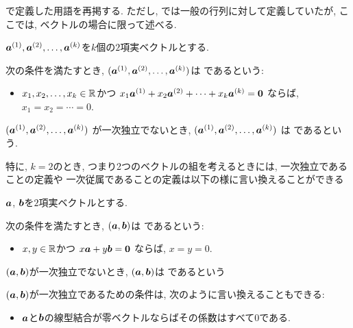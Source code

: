 で定義した用語を再掲する.
ただし, では一般の行列に対して定義していたが,
ここでは, ベクトルの場合に限って述べる.
\begin{definition}
  \label{def:linindep}
  $\boldsymbol{a}^{(1)}, \boldsymbol{a}^{(2)},\ldots, \boldsymbol{a}^{(k)}$を$k$個の$2$項実ベクトルとする.
  
  次の条件を満たすとき,
  $(\boldsymbol{a}^{(1)}, \boldsymbol{a}^{(2)},\ldots, \boldsymbol{a}^{(k)})$は
  であるという:
  \begin{itemize}
  \item
    $x_1,x_2,\ldots, x_k\in\mathbb{R}$かつ
    $x_1\boldsymbol{a}^{(1)}+x_2\boldsymbol{a}^{(2)}+\cdots+x_k\boldsymbol{a}^{(k)}=\boldsymbol{0}$
    ならば, $x_1=x_2=\cdots=0$.
  \end{itemize}

  $(\boldsymbol{a}^{(1)}, \boldsymbol{a}^{(2)},\ldots, \boldsymbol{a}^{(k)})$
  が一次独立でないとき,
  $(\boldsymbol{a}^{(1)}, \boldsymbol{a}^{(2)},\ldots, \boldsymbol{a}^{(k)})$
  は
  であるという.
\end{definition}


特に, $k=2$のとき, つまり2つのベクトルの組を考えるときには,
一次独立であることの定義や
一次従属であることの定義は以下の様に言い換えることができる
\begin{definition}
  $\boldsymbol{a}$, $\boldsymbol{b}$を$2$項実ベクトルとする.
  
  次の条件を満たすとき,
  $(\boldsymbol{a},\boldsymbol{b})$は
  であるという:
  \begin{itemize}
  \item
    $x,y\in\mathbb{R}$かつ
    $x\boldsymbol{a}+y\boldsymbol{b}=\boldsymbol{0}$
    ならば, $x=y=0$.
  \end{itemize}

  $(\boldsymbol{a},\boldsymbol{b})$が一次独立でないとき,
  $(\boldsymbol{a},\boldsymbol{b})$は
  であるという
\end{definition}
\begin{remark}
  $(\boldsymbol{a},\boldsymbol{b})$が一次独立であるための条件は,
  次のように言い換えることもできる:
  \begin{itemize}
  \item
    $\boldsymbol{a}$と$\boldsymbol{b}$の線型結合が零ベクトルならばその係数はすべて$0$である.
  \end{itemize}
\end{remark}

